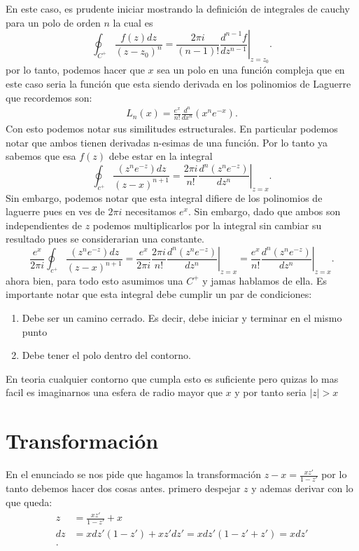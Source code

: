 \documentclass{report}
\begin{document}
En este caso, es prudente iniciar mostrando la definición de integrales de cauchy para un polo de orden $n$ la cual es \[
\oint_{C^{+}}\frac{f\left( z \right) dz}{\left( z-z_0 \right)^{n}}=\left.\frac{2\pi i}{\left( n-1 \right)!}\frac{d^{n-1}f}{dz^{n-1}}\right|_{z=z_0}
.\] 
  por lo tanto, podemos hacer que $x$ sea un polo en una función compleja que en este caso seria la función que esta siendo derivada en los polinomios de Laguerre que recordemos son:
  \begin{align*}
    L_{n}\left( x \right) =\frac{e^{x}}{n!}\frac{d^{n}}{dx^{n}}\left( x^{n}e^{-x} \right) 
  .\end{align*}
  Con esto podemos notar sus similitudes estructurales. En particular podemos notar que ambos tienen derivadas n-esimas de una función. Por lo tanto ya sabemos que esa $f\left( z \right) $ debe estar en la integral \[
  \oint_{c^{+}} \frac{(z^{n}e^{-z})dz}{\left( z-x \right)^{n+1} } = \left.\frac{2\pi i}{n!}\frac{d^{n}(z^{n}e^{-z})}{dz^{n}}\right|_{z=x}
  .\] Sin embargo, podemos notar que esta integral difiere de los polinomios de laguerre pues en ves de $2\pi i$ necesitamos $e^{x}$. Sin embargo, dado que ambos son independientes de $z$ podemos multiplicarlos por la integral sin cambiar su resultado pues se considerarian una constante. \[
  \frac{e^{x}}{2\pi i}\oint_{c^{+}}\frac{\left( z^{n}e^{-z} \right)dz }{\left( z-x \right)^{n+1} }=\frac{e^{x}}{2\pi i}\left.\frac{2\pi i}{n!}\frac{d^{n}(z^{n}e^{-z})}{dz^{n}}\right|_{z=x} = \left.\frac{e^{x}}{n!}\frac{d^{n}(z^{n}e^{-z})}{dz^{n}}\right|_{z=x}
  .\]  ahora bien, para todo esto asumimos una $C^{+}$ y jamas hablamos de ella. Es importante notar que esta integral debe cumplir un par de condiciones:
  \begin{enumerate}
    \item Debe ser un camino cerrado. Es decir, debe iniciar y terminar en el mismo punto
    \item Debe tener el polo dentro del contorno.
  \end{enumerate}
  En teoria cualquier contorno que cumpla esto es suficiente pero quizas lo mas facil es imaginarnos una esfera de radio mayor que $x$ y por tanto seria $|z|>x$

  \section{Transformación}

  En el enunciado se nos pide que hagamos la transformación  $z-x=\frac{xz'}{1-z'}$ por lo tanto debemos hacer dos cosas antes. primero despejar $z$ y ademas derivar con lo que queda:
  \begin{align*}
    z &= \frac{xz'}{1-z'}+x \\
    dz &= xdz'\left( 1-z' \right) + xz' dz'=  xdz'(1-z'+z') = xdz'\\
  .\end{align*}
\end{document}
